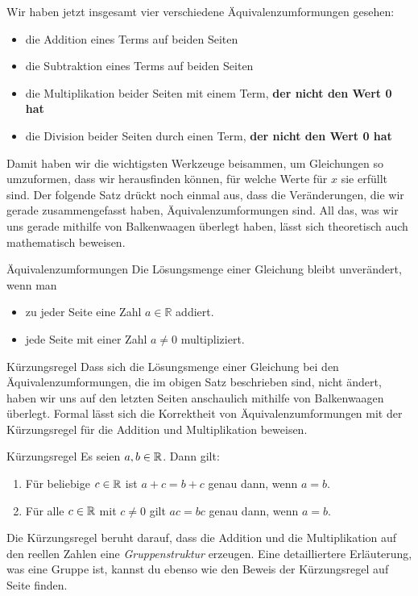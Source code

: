 \documentclass[../../main.tex]{subfiles}
\begin{document}
Wir haben jetzt insgesamt vier verschiedene Äquivalenzumformungen gesehen:
\begin{itemize}
    \item die Addition eines Terms auf beiden Seiten
    \item die Subtraktion eines Terms auf beiden Seiten
    \item die Multiplikation beider Seiten mit einem Term, \textbf{der nicht den Wert 0 hat}
    \item die Division beider Seiten durch einen Term, \textbf{der nicht den Wert 0 hat}
\end{itemize}

Damit haben wir die wichtigsten Werkzeuge beisammen, um Gleichungen so umzuformen, dass wir herausfinden können, für welche Werte für $x$ sie erfüllt sind. Der folgende Satz drückt noch einmal aus, dass die Veränderungen, die wir gerade zusammengefasst haben, Äquivalenzumformungen sind. All das, was wir uns gerade mithilfe von Balkenwaagen überlegt haben, lässt sich theoretisch auch mathematisch beweisen.

\begin{theorem}{Äquivalenzumformungen}
    Die Lösungsmenge einer Gleichung bleibt unverändert, wenn man
    \begin{itemize}
        \item zu jeder Seite eine Zahl $a\in\mathbb{R}$ addiert.
        \item jede Seite mit einer Zahl $a\neq 0$ multipliziert.
    \end{itemize}
\end{theorem}
\begin{advanced}{Kürzungsregel}
    Dass sich die Lösungsmenge einer Gleichung bei den Äquivalenzumformungen, die im obigen Satz beschrieben sind, nicht ändert, haben wir uns auf den letzten Seiten anschaulich mithilfe von Balkenwaagen überlegt. Formal lässt sich die Korrektheit von Äquivalenzumformungen mit der Kürzungsregel für die Addition und Multiplikation beweisen.
    
    \begin{theorem}{Kürzungsregel}
        Es seien $a,b\in\mathbb{R}$. Dann gilt: 
        \begin{enumerate}
            \item Für beliebige $c\in\mathbb{R}$ ist $a+c=b+c$ genau dann, wenn $a=b$.
            \item Für alle $c\in\mathbb{R}$ mit $c\neq 0$ gilt $ac=bc$ genau dann, wenn $a=b$.
        \end{enumerate}
    \end{theorem}
    
    Die Kürzungsregel beruht darauf, dass die Addition und die Multiplikation auf den reellen Zahlen eine \emph{Gruppenstruktur} erzeugen. Eine detailliertere Erläuterung, was eine Gruppe ist, kannst du ebenso wie den Beweis der Kürzungsregel auf Seite \pageref{} finden. 
\end{advanced}
\end{document}
